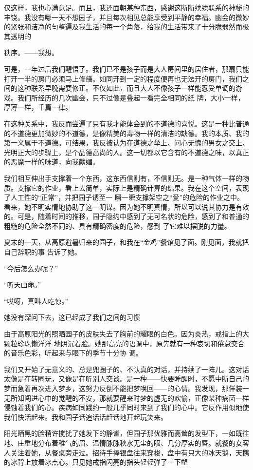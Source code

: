 \documentclass{article}
\begin{document}
仅这样，我也心满意足。而且，我还面朝某种东西，感谢这断断续续联系的神秘的丰饶。我没有哪一天不想园子，并且每次相见总能享受到平静的幸福。幽会的微妙的紧张和洁净的匀整遍及我生活的每一个角落，给我的生活带来了十分脆弱然而极其透明的

\newpage
秩序。——我想。 

可是，一年过后我们醒悟了。我们已不是孩子而是大人房间里的居住者，那扇只能打开一半的房门必须马上修缮。如同开到一定的程度便再也无法开的房门，我们之间的这种联系早晚需要修正。不仅如此，而且大人不像孩子一样能忍受单调的游戏。我们所经历的几次幽会，只不过像是叠起一看完全相同的纸
牌，大小一样，厚薄一样，千篇一律。 

在这种关系中，我反而尝遍了只有我才能体会到的不道德的喜悦。这是一种比普通的不道德更加微妙的不道德，是像精美的毒物一样的清洁的缺德。我的本质、我的第一义属于不道德。可结果，我反被认为在道德之举上、问心无愧的男女之交上、光明正大的步骤上，是个品德高尚的人。这一切都以它含有的不道德之味，以真正的恶魔一样的味道，向我献媚。

我们相互伸出手支撑着一个东西，这东西信则有，不信则无。是一种气体一样的物质。支撑它的作业，看上去简单，实际上是精确计算的结果。我在这个空间，表现了人工性的“正常”，并把园子诱至一
\newpage
瞬一瞬支撑架空之“爱”的危险的作业之中。看来，她不明实情地协助了这一阴谋。因为她不明真情，所以可以说其协力是有效的。可是，随着时间的推移，园子隐约中感到了无可名状的危险，感到了和普通的粗糙的危险全然不同的、具有精确密度的危险，感到
了它难以摆脱的力量。 

夏末的一天，从高原避暑归来的园子，和我在“金鸡”餐馆见了面。刚见面，我就把自己辞职的事
告诉了她。 


“今后怎么办呢？” 


“听天由命。” 


“哎呀，真叫人吃惊。” 

她没有深问下去，这已经成了我们之间的习惯

由于高原阳光的照晒园子的皮肤失去了胸前的耀眼的白色。因为炎热，戒指上的大颗粒珍珠懒洋洋
\newpage
地阴沉着脸。她那高亮的语调中，原先就有一种哀切和倦怠交合的音乐色彩，听起来与眼下的季节十分协
调。 

我们又开始了无意义的、总是兜圈子的、不认真的对话，并持续了一阵儿。这对话太像是在转圈玩，又像是在听别人交谈。是一种——快要睡醒时，不愿中断自己的梦而急着再次进入梦乡，这努力反倒不能把梦唤回——的心情。我发现，那佯装一无所知闯进心中的觉醒的不安，那就要醒来时梦的虚无的欢愉，正像某种病菌一样侵蚀着我们的心。疾病如同践约一般几乎同时来到了我们的心中。它反作用似地使我们快活起来。我和园子话追话话赶话地开起玩笑来。

阳光晒黑的脸稍许搅扰了她发下的静谧，但园子那优雅而高耸的发型下，一如既往地、庄重地分布着稚气的眉、温情脉脉秋水无尘的眼、几分厚实的唇。就餐的女客人关注着她，从餐桌旁走过。招待手捧银盘往来穿梭，盘中有只大的冰天鹅，天鹅的冰背上放着冰点心。只见她戒指闪亮的指头轻轻弹了一下塑
\end{document}
